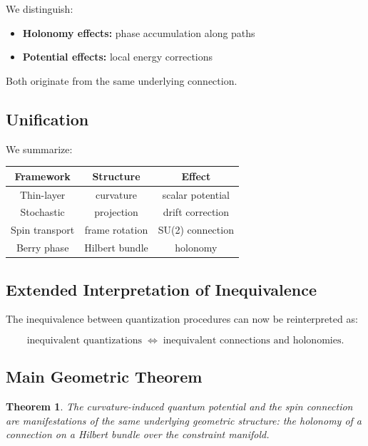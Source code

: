 \documentclass[11pt]{article}
\newtheorem{theorem}{Theorem}[section]
\begin{document}
We distinguish:

\begin{itemize}
\item \textbf{Holonomy effects:} phase accumulation along paths
\item \textbf{Potential effects:} local energy corrections
\end{itemize}

Both originate from the same underlying connection.

\subsection{Unification}

We summarize:

\begin{center}
\begin{tabular}{c|c|c}
Framework & Structure & Effect \\
\hline
Thin-layer & curvature & scalar potential \\
Stochastic & projection & drift correction \\
Spin transport & frame rotation & SU(2) connection \\
Berry phase & Hilbert bundle & holonomy
\end{tabular}
\end{center}

\subsection{Extended Interpretation of Inequivalence}

The inequivalence between quantization procedures can now be reinterpreted as:

\begin{equation}
\text{inequivalent quantizations}
\;\Longleftrightarrow\;
\text{inequivalent connections and holonomies}.
\end{equation}

\subsection{Main Geometric Theorem}

\begin{theorem}
The curvature-induced quantum potential and the spin connection are manifestations of the same underlying geometric structure: the holonomy of a connection on a Hilbert bundle over the constraint manifold.
\end{theorem}
\end{document}
